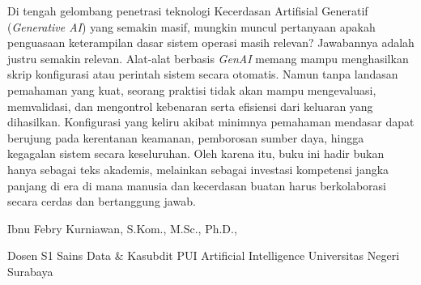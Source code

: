 \vspace{1cm}

\noindent
Di tengah gelombang penetrasi teknologi Kecerdasan Artifisial Generatif (\textit{Generative AI}) yang semakin masif, mungkin muncul pertanyaan apakah penguasaan keterampilan dasar sistem operasi masih relevan? Jawabannya adalah justru semakin relevan. Alat-alat berbasis \textit{GenAI} memang mampu menghasilkan skrip konfigurasi atau perintah sistem secara otomatis. Namun tanpa landasan pemahaman yang kuat, seorang praktisi tidak akan mampu mengevaluasi, memvalidasi, dan mengontrol kebenaran serta efisiensi dari keluaran yang dihasilkan. Konfigurasi yang keliru akibat minimnya pemahaman mendasar dapat berujung pada kerentanan keamanan, pemborosan sumber daya, hingga kegagalan sistem secara keseluruhan. Oleh karena itu, buku ini hadir bukan hanya sebagai teks akademis, melainkan sebagai investasi kompetensi jangka panjang di era di mana manusia dan kecerdasan buatan harus berkolaborasi secara cerdas dan bertanggung jawab.

\vspace{2cm}

\noindent
Ibnu Febry Kurniawan, S.Kom., M.Sc., Ph.D.,

\vspace{0.5cm}

\noindent
Dosen S1 Sains Data \& Kasubdit PUI Artificial Intelligence
Universitas Negeri Surabaya

\vspace{2cm}

\cleardoublepage
